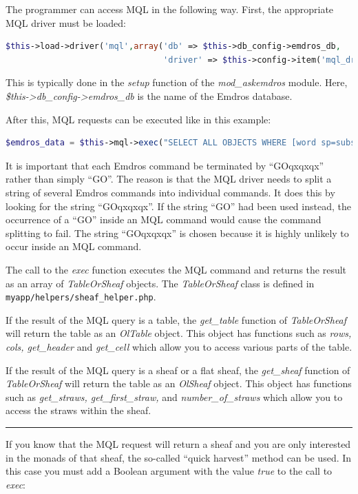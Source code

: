 \documentclass[11pt,oneside,a4paper]{memoir}
\begin{document}
The programmer can access MQL in the following way. First, the appropriate MQL driver must be
loaded:

\begin{lstlisting}[language=PHP]
$this->load->driver('mql',array('db' => $this->db_config->emdros_db,
                                'driver' => $this->config->item('mql_driver')));
\end{lstlisting}

This is typically done in the \emph{setup} function of the \emph{mod\_askemdros} module. Here,
\emph{\$this->db\_config\allowbreak{}->emdros\_db} is the name of the Emdros database.

After this, MQL requests can be executed like in this example:

\begin{lstlisting}[language=PHP]
$emdros_data = $this->mql->exec("SELECT ALL OBJECTS WHERE [word sp=subs GET text] GOqxqxqx");
\end{lstlisting}

It is important that each Emdros command be terminated by ``GOqxqxqx'' rather than simply ``GO''. The
reason is that the MQL driver needs to split a string of several Emdros commands into individual
commands. It does this by looking for the string ``GOqxqxqx''. If the string ``GO'' had been used
instead, the occurrence of a ``GO'' inside an MQL command would cause the command splitting to fail.
The string ``GOqxqxqx'' is chosen because it is highly unlikely to occur inside an MQL command.

The call to the \emph{exec} function executes the MQL command and returns the result as an array of
\emph{TableOrSheaf} objects. The \emph{TableOrSheaf} class is defined in
\texttt{myapp/helpers/sheaf\_helper.php}.

If the result of the MQL query is a table, the \emph{get\_table} function of \emph{TableOrSheaf}
will return the table as an \emph{OlTable} object.  This object has functions
such as \emph{rows, cols, get\_header} and \emph{get\_cell} which allow you to
access various parts of the table.

If the result of the MQL query is a sheaf or a flat sheaf, the \emph{get\_sheaf} function of
\emph{TableOrSheaf} will return the table as an \emph{OlSheaf} object. This object has functions
such as \emph{get\_straws, get\_first\_straw,} and \emph{number\_of\_straws} which allow you to
access the straws within the sheaf.

\pfbreak

If you know that the MQL request will return a sheaf and you are only interested in the monads of
that sheaf, the so-called ``quick harvest'' method can be used. In
this case you must add a Boolean argument with the value \emph{true} to the call to \emph{exec}:
\end{document}
